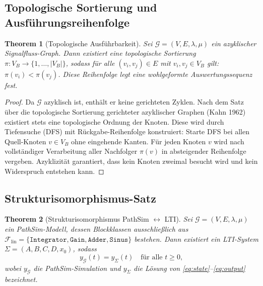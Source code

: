 ﻿\documentclass[12pt,a4paper]{article}
\newtheorem{theorem}{Theorem}[section]
\theoremstyle{definition}
\begin{document}
\subsection{Topologische Sortierung und Ausführungsreihenfolge}

\begin{theorem}[Topologische Ausführbarkeit]
\label{thm:topo}
Sei $\mathcal{G} = (V, E, \lambda, \mu)$ ein azyklischer Signal\-fluss-Graph.
Dann existiert eine topologische Sortierung $\pi : V_B \to \{1, \ldots, |V_B|\}$,
sodass für alle $(v_i, v_j) \in E$ mit $v_i, v_j \in V_B$ gilt:
$\pi(v_i) < \pi(v_j)$. Diese Reihenfolge legt eine wohlgeformte Auswertungssequenz
fest.
\end{theorem}

\begin{proof}
Da $\mathcal{G}$ azyklisch ist, enthält er keine gerichteten Zyklen. Nach dem
Satz über die topologische Sortierung gerichteter azyklischer Graphen (Kahn 1962)
existiert stets eine topologische Ordnung der Knoten. Diese wird durch Tiefensuche
(DFS) mit Rückgabe-Reihenfolge konstruiert: Starte DFS bei allen Quell-Knoten
$v \in V_B$ ohne eingehende Kanten. Für jeden Knoten $v$ wird nach vollständiger
Verarbeitung aller Nachfolger $\pi(v)$ in absteigender Reihenfolge vergeben.
Azyklizität garantiert, dass kein Knoten zweimal besucht wird und kein
Widerspruch entstehen kann.
\end{proof}

\subsection{Strukturisomorphismus-Satz}

\begin{theorem}[Strukturisomorphismus PathSim $\leftrightarrow$ LTI]
\label{thm:iso}
Sei $\mathcal{G} = (V, E, \lambda, \mu)$ ein PathSim-Modell, dessen Blockklassen
ausschlie\ss{}lich aus $\mathcal{F}_{\mathrm{lin}} = \{\texttt{Integrator},
\texttt{Gain}, \texttt{Adder}, \texttt{Sinus}\}$ bestehen. Dann
existiert ein LTI-System $\Sigma = (A, B, C, D, x_0)$, sodass
\[
  y_{\mathcal{G}}(t) = y_{\Sigma}(t) \quad \text{für alle } t \geq 0,
\]
wobei $y_{\mathcal{G}}$ die PathSim-Simulation und $y_{\Sigma}$ die Lösung
von \eqref{eq:state}--\eqref{eq:output} bezeichnet.
\end{theorem}
\end{document}
